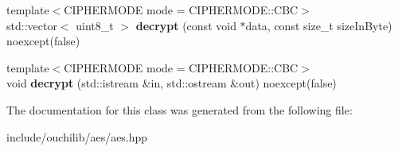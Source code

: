 \begin{DoxyCompactItemize}
{\footnotesize template$<$C\+I\+P\+H\+E\+R\+M\+O\+DE mode = C\+I\+P\+H\+E\+R\+M\+O\+D\+E\+::\+C\+BC$>$ }\\std\+::vector$<$ uint8\+\_\+t $>$ {\bfseries decrypt} (const void $\ast$data, const size\+\_\+t size\+In\+Byte) noexcept(false)
\item 
\mbox{\label{classouchi_1_1aes_afdec20ef7542e5abc1f9339a68cfff71}} 
{\footnotesize template$<$C\+I\+P\+H\+E\+R\+M\+O\+DE mode = C\+I\+P\+H\+E\+R\+M\+O\+D\+E\+::\+C\+BC$>$ }\\void {\bfseries decrypt} (std\+::istream \&in, std\+::ostream \&out) noexcept(false)
\end{DoxyCompactItemize}


The documentation for this class was generated from the following file\+:\begin{DoxyCompactItemize}
\item 
include/ouchilib/aes/aes.\+hpp\end{DoxyCompactItemize}
